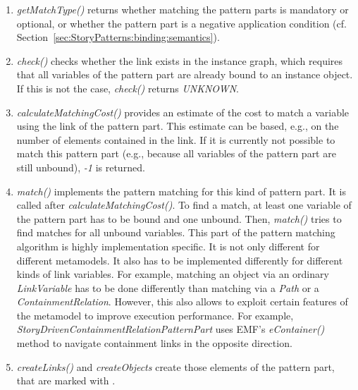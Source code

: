\begin{enumerate}
	\item \emph{getMatchType()} returns whether matching the pattern parts is mandatory or optional, or whether the pattern part is a negative application condition (cf. Section~\ref{sec:StoryPatterns:binding:semantics}). 
	
	\item \emph{check()} checks whether the link exists in the instance graph, which requires that all variables of the pattern part are already bound to an instance object. 
	If this is not the case, \emph{check()} returns \emph{UNKNOWN}. 

	\item \emph{calculateMatchingCost()} provides an estimate of the cost to match a variable using the link of the pattern part. 
	This estimate can be based, e.g., on the number of elements contained in the link.
	If it is currently not possible to match this pattern part (e.g., because all variables of the pattern part are still unbound), \emph{-1} is returned.

	\item \emph{match()} implements the pattern matching for this kind of pattern part. 
	It is called after \emph{calculateMatchingCost()}. 
	To find a match, at least one variable of the pattern part has to be bound and one unbound. 
	Then, \emph{match()} tries to find matches for all unbound variables. 
	This part of the pattern matching algorithm is highly implementation specific. 
	It is not only different for different metamodels. 
	It also has to be implemented differently for different kinds of link variables.
	For example, matching an object via an ordinary \emph{LinkVariable} has to be done differently than matching via a \emph{Path} or a \emph{ContainmentRelation}.
	However, this also allows to exploit certain features of the metamodel to improve execution performance. 
	For example, \emph{StoryDrivenContainmentRelationPatternPart} uses EMF's \emph{eContainer()} method to navigate containment links in the opposite direction.	
	
	\item \emph{createLinks()} and \emph{createObjects} create those elements of the pattern part, that are marked with \create.
	

\end{enumerate}
